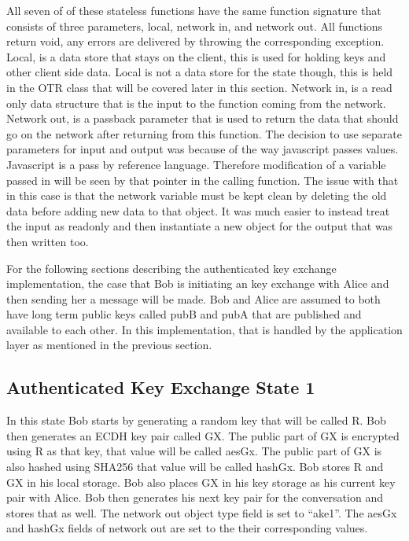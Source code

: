 All seven of of these stateless functions have the same function signature that consists of three parameters, local, network in, and network out. All functions return void, any errors are delivered by throwing the corresponding exception. Local, is a data store that stays on the client, this is used for holding keys and other client side data. Local is not a data store for the state though, this is held in the OTR class that will be covered later in this section. Network in, is a read only data structure that is the input to the function coming from the network. Network out, is a passback parameter that is used to return the data that should go on the network after returning from this function. The decision to use separate parameters for input and output was because of the way javascript passes values. Javascript is a pass by reference language. Therefore modification of a variable passed in will be seen by that pointer in the calling function. The issue with that in this case is that the network variable must be kept clean by deleting the old data before adding new data to that object. It was much easier to instead treat the input as readonly and then instantiate a new object for the output that was then written too.


For the following sections describing the authenticated key exchange implementation, the case that Bob is initiating an key exchange with Alice and then sending her a message will be made. Bob and Alice are assumed to both have long term public keys called pubB and pubA that are published and available to each other. In this implementation, that is handled by the application layer as mentioned in the previous section.


\subsection{Authenticated Key Exchange State 1}


In this state Bob starts by generating a random key that will be called R. Bob then generates an ECDH key pair called GX. The public part of GX is encrypted using R as that key, that value will be called aesGx. The public part of GX is also hashed using SHA256 that value will be called hashGx. Bob stores R and GX in his local storage. Bob also places GX in his key storage as his current key pair with Alice. Bob then generates his next key pair for the conversation and stores that as well. The network out object type field is set to “ake1”. The aesGx and hashGx fields of network out are set to the their corresponding values.


